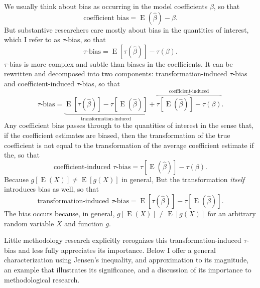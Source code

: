 \documentclass[12pt]{article}
\DeclareMathOperator*{\E}{\text{E}}
\begin{document}
We usually think about bias as occurring in the model coefficients $\beta$, so that 
\begin{equation}
\text{coefficient bias} = \E(\hat{\beta}) - \beta \text{.}  \nonumber
\end{equation}
But substantive researchers care mostly about bias in the quantities of interest, which I refer to as $\tau$-bias, so that
\begin{equation}
\tau\text{-bias} = \E[\tau(\hat{\beta})] - \tau(\beta)\text{.} \nonumber
\end{equation}
$\tau$-bias is more complex and subtle than biases in the coefficients. 
It can be rewritten and decomposed into two components: transformation-induced $\tau$-bias and coefficient-induced $\tau$-bias, so that
\begin{equation}
\tau\text{-bias}= \underbrace{ \E[\tau(\hat{\beta})]-  \tau[\E(\hat{\beta})]  }_{\text{transformation-induced}} + \overbrace{  \tau[\E(\hat{\beta})] - \tau(\beta)  }^{\text{coefficient-induced}}\text{.} \nonumber
\end{equation}
Any coefficient bias passes through to the quantities of interest in the sense that, if the coefficient estimates are biased, then the transformation of the true coefficient is not equal to the transformation of the average coefficient estimate if the, so that
\begin{equation}
\text{coefficient-induced } \tau\text{-bias} = \tau[\E(\hat{\beta})] - \tau(\beta) \text{.}\nonumber
\end{equation}
Because $g[\E(X)] \neq \E[g(X)]$ in general, 
But the transformation \textit{itself} introduces bias as well, so that
\begin{equation}
\text{transformation-induced } \tau\text{-bias} = \E[\tau(\hat{\beta})]-  \tau[\E(\hat{\beta})] \text{.}\nonumber
\end{equation}
The bias occurs because, in general, $g[\E(X)] \neq \E[g(X)]$ for an arbitrary random variable $X$ and function $g$.

Little methodology research explicitly recognizes this transformation-induced $\tau$-bias and less fully appreciates its importance. 
Below I offer a general characterization using Jensen's inequality, and approximation to its magnitude, an example that illustrates its significance, and a discussion of its importance to methodological research.

\end{document}
